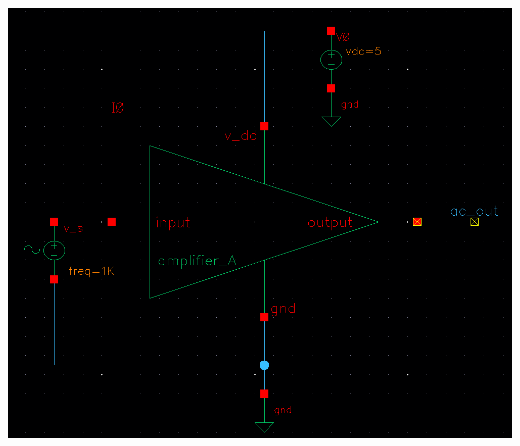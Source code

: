 \documentclass[12pt, fleqn]{article}
\begin{document}
\includegraphics[scale=0.3, center]{a_tb.png}
\newpage
\end{document}
